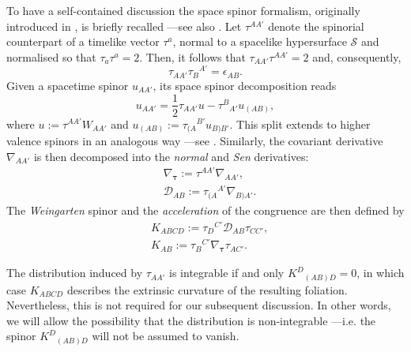 \documentclass[10pt,a4paper]{article}
\theoremstyle{plain}
\newcounter{mnotecount}%
\newcommand{\mnotex}[1]%
{\protect{\stepcounter{mnotecount}}$^{\mbox{\footnotesize $\bullet$\themnotecount}}$ 
\marginpar{%
\raggedright\tiny\em
$\!\!\!\!\!\!\,\bullet$\themnotecount: #1} }
\begin{document}
To have a self-contained discussion the space spinor
formalism, originally introduced in \cite{Som80}, is briefly recalled
---see also \cite{GarVal08c,BaeVal10b,CFEbook}.  Let $\tau^{AA'}$
denote the spinorial counterpart of a timelike vector $\tau^{a}$,
normal to a spacelike hypersurface $\mathcal{S}$ and normalised so
that $\tau_{a}\tau^{a}=2$.  Then, it follows that
$\tau_{AA'}\tau^{AA'}=2$ and, consequently,
\[\tau_{AA'}\tau_B{}^{A'}=\epsilon_{AB}.\]
Given a spacetime spinor $u_{AA'}$, its space spinor decomposition
reads
\[
u_{AA'}= \frac{1}{2}\tau_{AA'}u-\tau^{B}{}_{A'}u_{(AB)},
\]
where $u:=\tau^{AA'}W_{AA'}$ and $u_{(AB)}:=\tau_{(A}{}^{B'}u_{B)B'}$.
This split extends to higher valence spinors in an analogous way
---see \cite{GarVal08c,BaeVal10b,CFEbook}. Similarly,
the covariant derivative $\nabla_{AA'}$ is then decomposed into the
\emph{normal} and \emph{Sen} derivatives:
\begin{align*}
  &\nabla_{\bm\tau} := \tau^{AA'}\nabla_{AA'},\\ & \mathcal{D}_{AB}:=
  \tau_{(A}{}^{A'}\nabla_{B)A'}.
\end{align*}
The \emph{Weingarten} spinor and the \emph{acceleration} of the
congruence are then defined by
\begin{align*}
& K_{ABCD} := \tau_{D}{}^{C'} \mathcal{D}_{AB}\tau_{CC'},\\ &
  K_{AB} := \tau_{B}{}^{C'} \nabla_{\bm\tau}\tau_{AC'}.
\end{align*}

The distribution induced by $\tau_{AA'}$ is integrable if and only
$K^D{}_{(AB)D}=0$, in which case $K_{ABCD}$ describes the extrinsic
curvature of the resulting foliation.
 Nevertheless, this is not required for our subsequent discussion.
In other words, we will allow
 the possibility that the distribution is non-integrable
---i.e. the spinor $ K^D{}_{(AB)D}$ will not be assumed
to vanish.
\end{document}
